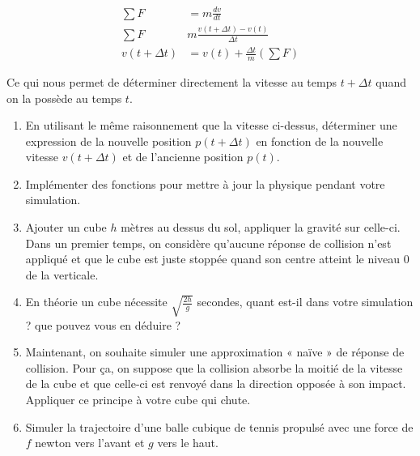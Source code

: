 \documentclass[a4paper,12pt]{article}
\begin{document}
\begin{align}
\sum F &= m \frac{dv}{dt} \\
\sum F & m \frac{v(t+\Delta t)-v(t)}{\Delta t} \\
v(t+\Delta t) &= v(t) + \frac{\Delta t}{m}(\sum F)
\end{align}

Ce qui nous permet de déterminer directement la vitesse au temps $t+\Delta t$ quand on la possède au temps $t$. 


\begin{enumerate}
    \item En utilisant le même raisonnement que la vitesse ci-dessus, déterminer une expression de la nouvelle position $p(t+\Delta t)$ en fonction de la nouvelle vitesse $v(t+\Delta t)$ et de l'ancienne position $p(t)$.  
    \item Implémenter des fonctions pour mettre à jour la physique pendant votre simulation.
    \item Ajouter un cube $h$ mètres au dessus du sol, appliquer la gravité sur celle-ci. Dans un premier temps, on considère qu'aucune réponse de collision n'est appliqué et que le cube est juste stoppée quand son centre atteint le niveau $0$ de la verticale. 
    \item En théorie un cube nécessite $\sqrt{\frac{2h}{g}}$ secondes, quant est-il dans votre simulation ? que pouvez vous en déduire ?
    \item Maintenant, on souhaite simuler une approximation « naïve » de réponse de collision. Pour ça, on suppose que la collision absorbe la moitié de la vitesse de la cube et que celle-ci est renvoyé dans la direction opposée à son impact. Appliquer ce principe à votre cube qui chute.
    \item Simuler la trajectoire d'une balle cubique de tennis propulsé avec une force de $f$ newton vers l'avant et $g$ vers le haut.
\end{enumerate}
\end{document}
